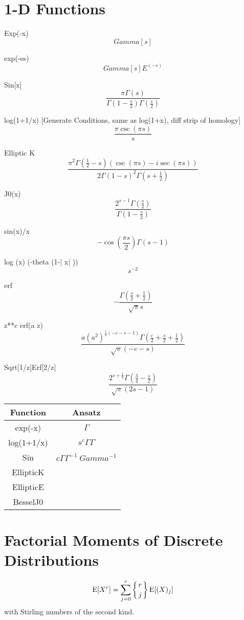 \documentclass{article}
\begin{document}
\section{1-D Functions}

Exp(-x)
$$
Gamma[s]
$$

exp(-es)
$$
Gamma[s] E^(-s)
$$

Sin[x]
$$
\frac{\pi \Gamma(s)}{\Gamma \left(1-\frac{s}{2}\right) \Gamma \left(\frac{s}{2}\right)}
$$

log(1+1/x) [Generate Conditions, same as log(1+x), diff strip of homology]
$$
\frac{\pi  \csc (\pi  s)}{s}
$$

Elliptic K
$$
\frac{\pi ^2 \Gamma \left(\frac{1}{2}-s\right) (\csc (\pi  s)-i \sec (\pi  s))}{2 \Gamma
    (1-s)^2 \Gamma \left(s+\frac{1}{2}\right)}
$$
    
J0(x)
$$
\frac{2^{s-1} \Gamma \left(\frac{s}{2}\right)}{\Gamma \left(1-\frac{s}{2}\right)}
$$

sin(x)/x
$$
 -\cos \left(\frac{\pi  s}{2}\right) \Gamma (s-1)
$$

 log (x) (-theta (1-| x| ))
$$
s^{-2}
$$

erf
$$
-\frac{\Gamma \left(\frac{s}{2}+\frac{1}{2}\right)}{\sqrt{\pi } s}
$$

z**c erf(a z)
$$
\frac{a \left(a^2\right)^{\frac{1}{2} (-c-s-1)} \Gamma
    \left(\frac{c}{2}+\frac{s}{2}+\frac{1}{2}\right)}{\sqrt{\pi } (-c-s)}
$$

Sqrt[1/z]Erf[2/z]
$$
\frac{2^{s+\frac{1}{2}} \Gamma \left(\frac{3}{4}-\frac{s}{2}\right)}{\sqrt{\pi } (2
    s-1)}
$$


    
\begin{tabular}{|c|c|}
Function & Ansatz \\
\hline
exp(-x) & $\Gamma$ \\
log(1+1/x) & $ s^c \Gamma \Gamma$ \\
Sin & $c \Gamma \Gamma^{-1} \ Gamma ^{-1}$ \\
EllipticK & \\
EllipticE & \\
BesselJ0 & \\
\end{tabular}

\section{Factorial Moments of Discrete Distributions}
$$\operatorname{E}[X^r] = \sum_{j=0}^r \left\{ {r \atop j} \right\} \operatorname{E}[(X)_j]$$ 
with Stirling numbers of the second kind.
\end{document}
